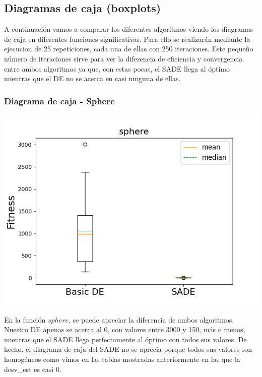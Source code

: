 \documentclass[11pt, a4paper, titlepage]{article}
\begin{document}
\subsection{Diagramas de caja (boxplots)}
A continuación vamos a comparar los diferentes algoritmos viendo los diagramas de caja en diferentes funciones significativas. Para ello se realizarán mediante la ejecucion de 25 repeticiones, cada una de ellas con 250 iteraciones. Este pequeño número de iteraciones sirve para ver la diferencia de eficiencia y convergencia entre ambos algoritmos ya que, con estas pocas, el SADE llega al óptimo mientras que el DE no se acerca en casi ninguna de ellas.
\subsubsection{Diagrama de caja - Sphere}
\begin{center}
\includegraphics[scale=0.85]{sphere}
\end{center}
En la función $sphere$, se puede apreciar la diferencia de ambos algoritmos. Nuestro DE apenas se acerca al 0, con valores entre 3000 y 150, más o menos, mientras que el SADE llega perfectamente al óptimo con todos sus valores. De hecho, el diagrama de caja del SADE no se aprecia porque todos sus valores son homogéneos como vimos en las tablas mostradas anteriormente en las que la desv\_est es casi 0.
\end{document}
